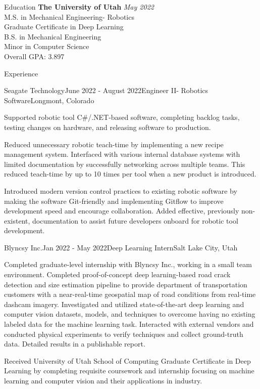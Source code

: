 \documentclass{resume}
\begin{document}
  \begin{rSection}{Education}
    {\bf The University of Utah} \hfill {\em May 2022} \\ 
    { M.S. in Mechanical Engineering- Robotics } \\
    {Graduate Certificate in Deep Learning} \\
    { B.S. in Mechanical Engineering } \\
    { Minor in Computer Science } \smallskip \\
    Overall GPA: 3.897 
  \end{rSection}
  
  \begin{rSection}{Experience}

    \begin{rSubsection}{Seagate Technology}{June 2022 - August 2022}{Engineer II- Robotics Software}{Longmont, Colorado}
    \item Supported robotic tool C\#/.NET-based software, completing backlog tasks, testing changes on hardware, and releasing software to production. 
    \item Reduced unnecessary robotic teach-time by implementing a new recipe management system. Interfaced with various internal database systems with limited documentation by successfully networking across multiple teams. This reduced teach-time by up to 10 times per tool when a new product is introduced.
    \item Introduced modern version control practices to existing robotic software by making the software Git-friendly and implementing Gitflow to improve development speed and encourage collaboration. Added effective, previously non-existent, documentation to assist future developers onboard for robotic tool development.
    \end{rSubsection}

    \begin{rSubsection}{Blyncsy Inc.}{Jan 2022 - May 2022}{Deep Learning Intern}{Salt Lake City, Utah}
    \item Completed graduate-level internship with Blyncsy Inc., working in a small team environment. Completed proof-of-concept deep learning-based road crack detection and size estimation pipeline to provide department of transportation customers with a near-real-time geospatial map of road conditions from real-time dashcam imagery. Investigated and utilized state-of-the-art deep learning and computer vision datasets, models, and techniques to overcome having no existing labeled data for the machine learning task. Interacted with external vendors and conducted physical experiments to verify techniques and collect ground-truth data. Detailed results in a publishable report.
    \item Received University of Utah School of Computing Graduate Certificate in Deep Learning by completing requisite coursework and internship focusing on machine learning and computer vision and their applications in industry.
    \end{rSubsection}
  

\end{rSection}
\end{document}
